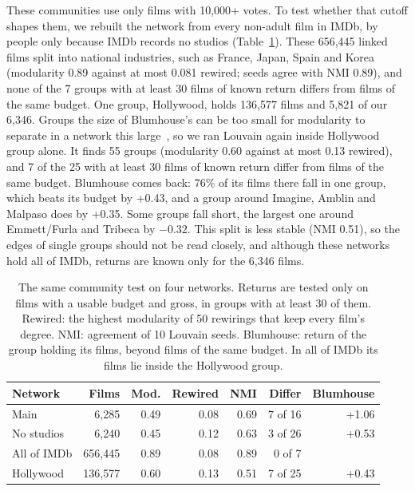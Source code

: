 \documentclass[9pt,twocolumn,twoside]{pnas-new}
\begin{document}
These communities use only films with 10,000+ votes. To test whether that cutoff shapes them, we rebuilt the network from every non-adult film in IMDb, by people only because IMDb records no studios (Table~\ref{tab:networks}). These 656,445 linked films split into national industries, such as France, Japan, Spain and Korea (modularity 0.89 against at most 0.081 rewired; seeds agree with NMI 0.89), and none of the 7 groups with at least 30 films of known return differs from films of the same budget. One group, Hollywood, holds 136,577 films and 5,821 of our 6,346. Groups the size of Blumhouse's can be too small for modularity to separate in a network this large~\cite{fortunato2007resolution}, so we ran Louvain again inside Hollywood group alone. It finds 55 groups (modularity 0.60 against at most 0.13 rewired), and 7 of the 25 with at least 30 films of known return differ from films of the same budget. Blumhouse comes back: 76\% of its films there fall in one group, which beats its budget by +0.43, and a group around Imagine, Amblin and Malpaso does by +0.35. Some groups fall short, the largest one around Emmett/Furla and Tribeca by $-0.32$. This split is less stable (NMI 0.51), so the edges of single groups should not be read closely, and although these networks hold all of IMDb, returns are known only for the 6,346 films.

\begin{table}
\centering
\caption{The same community test on four networks. Returns are tested only on films with a usable budget and gross, in groups with at least 30 of them. Rewired: the highest modularity of 50 rewirings that keep every film's degree. NMI: agreement of 10 Louvain seeds. Blumhouse: return of the group holding its films, beyond films of the same budget. In all of IMDb its films lie inside the Hollywood group.}
\label{tab:networks}
\small
\setlength{\tabcolsep}{3pt}
\begin{tabular}{lrrrrrr}
\toprule
Network & Films & Mod. & Rewired & NMI & Differ & Blumhouse \\
\midrule
Main & 6,285 & 0.49 & 0.08 & 0.69 & 7 of 16 & +1.06 \\
No studios & 6,240 & 0.45 & 0.12 & 0.63 & 3 of 26 & +0.53 \\
All of IMDb & 656,445 & 0.89 & 0.08 & 0.89 & 0 of 7 & \\
Hollywood & 136,577 & 0.60 & 0.13 & 0.51 & 7 of 25 & +0.43 \\
\bottomrule
\end{tabular}
\end{table}
\end{document}
